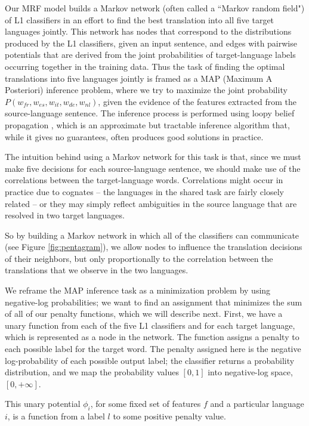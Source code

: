 \documentclass[11pt,letterpaper]{article}
\begin{document}
Our MRF model builds a Markov network (often called a ``Markov random
field") of L1 classifiers in an effort to find the best translation into
all five target languages jointly. This network has nodes that correspond to
the distributions produced by the L1 classifiers, given an input
sentence, and edges with pairwise potentials that are derived from the joint
probabilities of target-language labels occurring together in the training
data. 
Thus the task of finding the optimal translations into five languages jointly
is framed as a MAP (Maximum A Posteriori) inference problem, where we try to
maximize the joint probability $P(w_{fr},w_{es},w_{it},w_{de},w_{nl})$, given
the evidence of the features extracted from the source-language sentence. The
inference process is performed using loopy belief propagation
\cite{DBLP:conf/uai/MurphyWJ99}, which is an approximate but tractable
inference algorithm that, while it gives no guarantees, often produces good
solutions in practice.

The intuition behind using a Markov network for this task is that, since we
must make five decisions for each source-language sentence, we should make use
of the correlations between the target-language words. Correlations might occur
in practice due to cognates -- the languages in the shared task are fairly
closely related -- or they may simply reflect ambiguities in the source
language that are resolved in two target languages.

So by building a Markov network in which all of the classifiers can
communicate (see Figure \ref{fig:pentagram}), we allow nodes to influence the
translation decisions of their neighbors, but only proportionally to the
correlation between the translations that we observe in the two languages.

We reframe the MAP inference task as a minimization problem by using
negative-log probabilities; we want to find an assignment that minimizes the
sum of all of our penalty functions, which we will describe next.
First, we have a unary function from each of the five L1 classifiers and for
each target language, which is represented as a node in the network. The
function assigns a penalty to each possible label for the target word. The
penalty assigned here is the negative log-probability of each possible output
label; the classifier returns a probability distribution, and we map the
probability values $[0,1]$ into negative-log space, $[0, +\infty]$.

This unary potential $\phi_i$, for some fixed set of features $f$ and a
particular language $i$, is a function from a label $l$ to some positive
penalty value.
\end{document}
